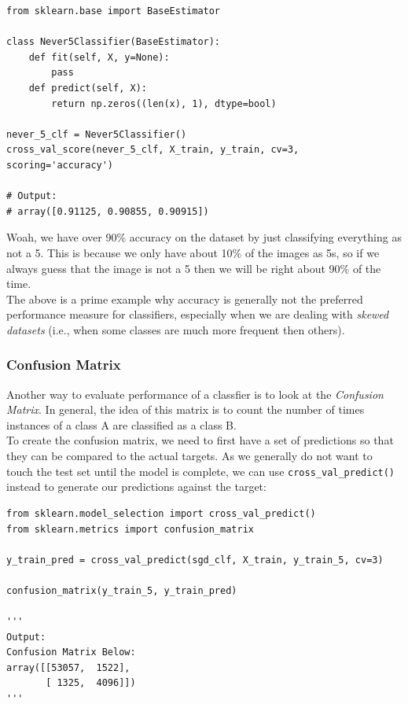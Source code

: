 \begin{verbatim}
from sklearn.base import BaseEstimator

class Never5Classifier(BaseEstimator):
    def fit(self, X, y=None):
        pass
    def predict(self, X):
        return np.zeros((len(x), 1), dtype=bool)

never_5_clf = Never5Classifier()
cross_val_score(never_5_clf, X_train, y_train, cv=3, scoring='accuracy')

# Output:
# array([0.91125, 0.90855, 0.90915])
\end{verbatim}

\noindent
Woah, we have over 90\% accuracy on the dataset by just classifying everything as not a 5. This is 
because we only have about 10\% of the images as 5s, so if we always guess that the image is not a 
5 then we will be right about 90\% of the time. \\

\noindent 
The above is a prime example why accuracy is generally not the preferred performance measure for 
classifiers, especially when we are dealing with \textit{skewed datasets} (i.e., when some classes
are much more frequent then others).

\subsubsection{Confusion Matrix}

Another way to evaluate performance of a classfier is to look at the \textit{Confusion Matrix}. In
general, the idea of this matrix is to count the number of times instances of a class A are classified
as a class B. \\ 

\noindent
To create the confusion matrix, we need to first have a set of predictions so that they can be compared
to the actual targets. As we generally do not want to touch the test set until the model is complete,
we can use \texttt{cross_val_predict()} instead to generate our predictions against the 
target:

\begin{verbatim}
from sklearn.model_selection import cross_val_predict()
from sklearn.metrics import confusion_matrix

y_train_pred = cross_val_predict(sgd_clf, X_train, y_train_5, cv=3)

confusion_matrix(y_train_5, y_train_pred)

'''
Output:
Confusion Matrix Below:
array([[53057,  1522],
       [ 1325,  4096]])
'''
\end{verbatim}

